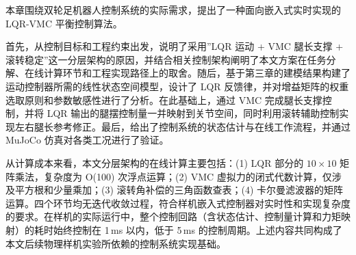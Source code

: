 本章围绕双轮足机器人控制系统的实际需求，提出了一种面向嵌入式实时实现的 LQR-VMC 平衡控制算法。

首先，从控制目标和工程约束出发，说明了采用”LQR 运动 + VMC 腿长支撑 + 滚转稳定”这一分层架构的原因，并结合相关控制架构阐明了本文方案在任务分解、在线计算环节和工程实现路径上的取舍。随后，基于第三章的建模结果构建了运动控制器所需的线性状态空间模型，设计了 LQR 反馈律，并对增益矩阵的权重选取原则和参数敏感性进行了分析。在此基础上，通过 VMC 完成腿长支撑控制，并将 LQR 输出的腿摆控制量一并映射到关节空间，同时利用滚转辅助控制实现左右腿长参考修正。最后，给出了控制系统的状态估计与在线工作流程，并通过 MuJoCo 仿真对各类工况进行了验证。

从计算成本来看，本文分层架构的在线计算主要包括：(1) LQR 部分的 $10\times 10$ 矩阵乘法，复杂度为 O(100) 次浮点运算；(2) VMC 虚拟力的闭式代数计算，仅涉及平方根和少量乘加；(3) 滚转角补偿的三角函数查表；(4) 卡尔曼滤波器的矩阵运算。四个环节均无迭代收敛过程，符合样机嵌入式控制器对实时性和实现复杂度的要求。在样机的实际运行中，整个控制回路（含状态估计、控制量计算和力矩映射）的耗时始终控制在 1\,ms 以内，低于 5\,ms 的控制周期。上述内容共同构成了本文后续物理样机实验所依赖的控制系统实现基础。
